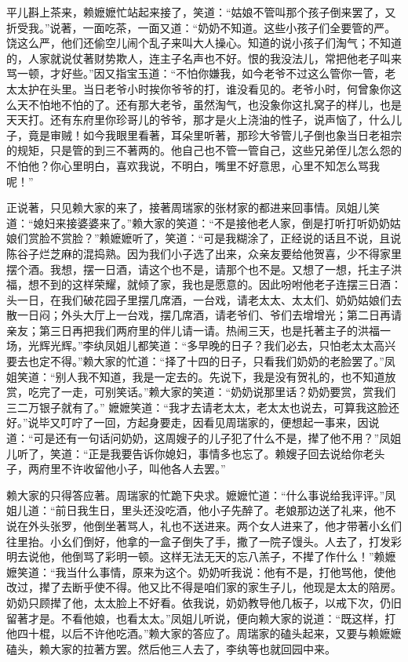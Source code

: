 \begin{parag}
    平儿斟上茶来，赖嬷嬷忙站起来接了，笑道：“姑娘不管叫那个孩子倒来罢了，又折受我。”说著，一面吃茶，一面又道：“奶奶不知道。这些小孩子们全要管的严。饶这么严，他们还偷空儿闹个乱子来叫大人操心。知道的说小孩子们淘气；不知道的，人家就说仗著财势欺人，连主子名声也不好。恨的我没法儿，常把他老子叫来骂一顿，才好些。”因又指宝玉道：“不怕你嫌我，如今老爷不过这么管你一管，老太太护在头里。当日老爷小时挨你爷爷的打，谁没看见的。老爷小时，何曾象你这么天不怕地不怕的了。还有那大老爷，虽然淘气，也没象你这扎窝子的样儿，也是天天打。还有东府里你珍哥儿的爷爷，那才是火上浇油的性子，说声恼了，什么儿子，竟是审贼！如今我眼里看著，耳朵里听著，那珍大爷管儿子倒也象当日老祖宗的规矩，只是管的到三不著两的。他自己也不管一管自己，这些兄弟侄儿怎么怨的不怕他？你心里明白，喜欢我说，不明白，嘴里不好意思，心里不知怎么骂我呢！”
\end{parag}


\begin{parag}
    正说著，只见赖大家的来了，接著周瑞家的张材家的都进来回事情。凤姐儿笑道：“媳妇来接婆婆来了。”赖大家的笑道：“不是接他老人家，倒是打听打听奶奶姑娘们赏脸不赏脸？”赖嬷嬷听了，笑道：“可是我糊涂了，正经说的话且不说，且说陈谷子烂芝麻的混捣熟。因为我们小子选了出来，众亲友要给他贺喜，少不得家里摆个酒。我想，摆一日酒，请这个也不是，请那个也不是。又想了一想，托主子洪福，想不到的这样荣耀，就倾了家，我也是愿意的。因此吩咐他老子连摆三日酒：头一日，在我们破花园子里摆几席酒，一台戏，请老太太、太太们、奶奶姑娘们去散一日闷；外头大厅上一台戏，摆几席酒，请老爷们、爷们去增增光；第二日再请亲友；第三日再把我们两府里的伴儿请一请。热闹三天，也是托著主子的洪福一场，光辉光辉。”李纨凤姐儿都笑道：“多早晚的日子？我们必去，只怕老太太高兴要去也定不得。”赖大家的忙道：“择了十四的日子，只看我们奶奶的老脸罢了。”凤姐笑道：“别人我不知道，我是一定去的。先说下，我是没有贺礼的，也不知道放赏，吃完了一走，可别笑话。”赖大家的笑道：“奶奶说那里话？奶奶要赏，赏我们三二万银子就有了。” 嬷嬷笑道：“我才去请老太太，老太太也说去，可算我这脸还好。”说毕又叮咛了一回，方起身要走，因看见周瑞家的，便想起一事来，因说道：“可是还有一句话问奶奶，这周嫂子的儿子犯了什么不是，撵了他不用？”凤姐儿听了，笑道：“正是我要告诉你媳妇，事情多也忘了。赖嫂子回去说给你老头子，两府里不许收留他小子，叫他各人去罢。”
\end{parag}


\begin{parag}
    赖大家的只得答应著。周瑞家的忙跪下央求。嬷嬷忙道：“什么事说给我评评。”凤姐儿道：“前日我生日，里头还没吃酒，他小子先醉了。老娘那边送了礼来，他不说在外头张罗，他倒坐著骂人，礼也不送进来。两个女人进来了，他才带著小幺们往里抬。小幺们倒好，他拿的一盒子倒失了手，撒了一院子馒头。人去了，打发彩明去说他，他倒骂了彩明一顿。这样无法无天的忘八羔子，不撵了作什么！”赖嬷嬷笑道：“我当什么事情，原来为这个。奶奶听我说：他有不是，打他骂他，使他改过，撵了去断乎使不得。他又比不得是咱们家的家生子儿，他现是太太的陪房。奶奶只顾撵了他，太太脸上不好看。依我说，奶奶教导他几板子，以戒下次，仍旧留著才是。不看他娘，也看太太。”凤姐儿听说，便向赖大家的说道：“既这样，打他四十棍，以后不许他吃酒。”赖大家的答应了。周瑞家的磕头起来，又要与赖嬷嬷磕头，赖大家的拉著方罢。然后他三人去了，李纨等也就回园中来。
\end{parag}


